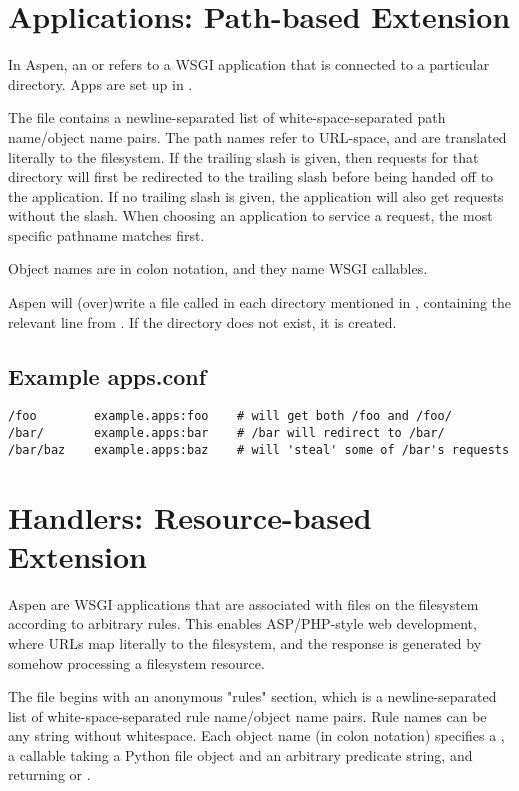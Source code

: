 \section{Applications: Path-based Extension \label{apps}}

In Aspen, an  or  refers to a WSGI application that is
connected to a particular directory. Apps are set up in .

The  file contains a newline-separated list of
white-space-separated path name/object name pairs. The path names refer to
URL-space, and are translated literally to the filesystem. If the trailing slash
is given, then requests for that directory will first be redirected to the
trailing slash before being handed off to the application. If no trailing slash
is given, the application will also get requests without the slash. When
choosing an application to service a request, the most specific pathname matches
first.

Object names are in colon notation, and they name WSGI callables.

Aspen will (over)write a file called  in each directory
mentioned in , containing the relevant line from
. If the directory does not exist, it is created.


\subsection{Example apps.conf \label{apps.conf}}

\begin{verbatim}
/foo        example.apps:foo    # will get both /foo and /foo/
/bar/       example.apps:bar    # /bar will redirect to /bar/
/bar/baz    example.apps:baz    # will 'steal' some of /bar's requests
\end{verbatim}


\section{Handlers: Resource-based Extension \label{handlers}}

Aspen  are WSGI applications that are associated with files on the
filesystem according to arbitrary rules. This enables ASP/PHP-style web
development, where URLs map literally to the filesystem, and the response is
generated by somehow processing a filesystem resource.

The  file begins with an anonymous "rules" section,
which is a newline-separated list of white-space-separated rule name/object name
pairs. Rule names can be any string without whitespace. Each object name (in
colon notation) specifies a , a callable taking a Python file object
and an arbitrary predicate string, and returning  or .

